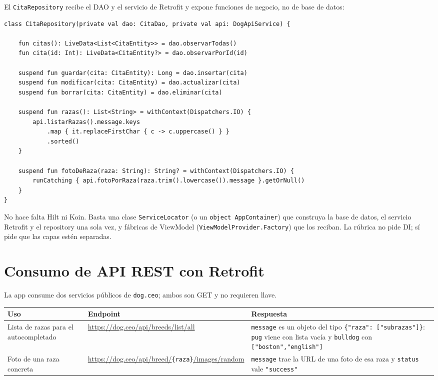 \documentclass[11pt,letterpaper]{article}
\newcommand{\code}[1]{\texttt{\small #1}}
\begin{document}
El \code{CitaRepository} recibe el DAO y el servicio de Retrofit y expone
funciones de negocio, no de base de datos:

\begin{verbatim}
class CitaRepository(private val dao: CitaDao, private val api: DogApiService) {

    fun citas(): LiveData<List<CitaEntity>> = dao.observarTodas()
    fun cita(id: Int): LiveData<CitaEntity?> = dao.observarPorId(id)

    suspend fun guardar(cita: CitaEntity): Long = dao.insertar(cita)
    suspend fun modificar(cita: CitaEntity) = dao.actualizar(cita)
    suspend fun borrar(cita: CitaEntity) = dao.eliminar(cita)

    suspend fun razas(): List<String> = withContext(Dispatchers.IO) {
        api.listarRazas().message.keys
            .map { it.replaceFirstChar { c -> c.uppercase() } }
            .sorted()
    }

    suspend fun fotoDeRaza(raza: String): String? = withContext(Dispatchers.IO) {
        runCatching { api.fotoPorRaza(raza.trim().lowercase()).message }.getOrNull()
    }
}
\end{verbatim}

\begin{techbox}
No hace falta Hilt ni Koin. Basta una clase \code{ServiceLocator} (o un
\code{object AppContainer}) que construya la base de datos, el servicio Retrofit y
el repository una sola vez, y f\'abricas de ViewModel
(\code{ViewModelProvider.\allowbreak{}Factory}) que los reciban. La r\'ubrica no pide DI; s\'i
pide que las capas est\'en separadas.
\end{techbox}

\section{Consumo de API REST con Retrofit}
\label{sec:api}

La app consume dos servicios p\'ublicos de \code{dog.ceo}; ambos son GET y no
requieren llave.

\begin{center}
\small
\begin{xltabular}{\linewidth}{@{}l l X@{}}
\toprule
\textbf{Uso} & \textbf{Endpoint} & \textbf{Respuesta}\\
\midrule
\endhead
\bottomrule
\endlastfoot
Lista de razas para el autocompletado &
\url{https://dog.ceo/api/breeds/list/all} &
\code{message} es un objeto del tipo \code{\{"raza":\allowbreak{} ["subrazas"]\}}:
\code{pug} viene con lista vac\'ia y \code{bulldog} con
\code{["boston",\allowbreak{}"english"]}\\
Foto de una raza concreta &
\url{https://dog.ceo/api/breed/}\code{\{raza\}}\url{/images/random} &
\code{message} trae la URL de una foto de esa raza y \code{status} vale
\code{"success"}\\
\end{xltabular}
\end{center}
\end{document}
